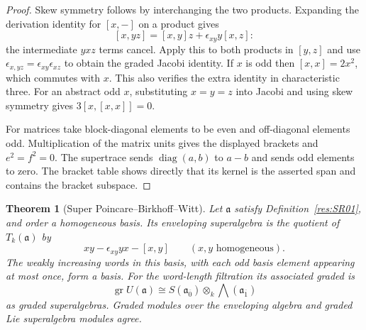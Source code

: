 \documentclass[11pt,oneside,openany]{book}
\newtheorem{theorem}{Theorem}[chapter]
\theoremstyle{definition}
\theoremstyle{remark}
\begin{document}
\begin{proof}
Skew symmetry follows by interchanging the two products.
Expanding the derivation identity for \([x,-]\) on a
product gives
\[
 [x,yz]=[x,y]z+\epsilon_{xy}y[x,z]:
\]
the intermediate \(yxz\) terms cancel. Apply this to both
products in \([y,z]\) and use
\(\epsilon_{x,yz}=\epsilon_{xy}\epsilon_{xz}\) to obtain
the graded Jacobi identity. If \(x\) is odd then
\([x,x]=2x^2\), which commutes with \(x\). This also
verifies the extra identity in characteristic three.
For an abstract odd \(x\), substituting \(x=y=z\) into
Jacobi and using skew symmetry gives \(3[x,[x,x]]=0\).

For matrices take block-diagonal elements to be even
and off-diagonal elements odd. Multiplication of the
matrix units gives the displayed brackets
and \(e^2=f^2=0\).
The supertrace sends \(\operatorname{diag}(a,b)\)
to \(a-b\) and sends odd elements to zero. The
bracket table shows directly that its kernel is
the asserted span and contains the bracket subspace.
\end{proof}

\begin{theorem}[Super Poincare--Birkhoff--Witt]
\label{res:SR03}
Let \(\mathfrak a\) satisfy Definition~\ref{res:SR01}, and
order a homogeneous basis. Its enveloping superalgebra is
the quotient of \(T_k(\mathfrak a)\) by
\[
 xy-\epsilon_{xy}yx-[x,y]\qquad(x,y\text{ homogeneous}).
\]
The weakly increasing words in this basis, with each
odd basis element appearing at most once, form a basis.
For the word-length filtration its associated graded is
\[
 \operatorname{gr} U(\mathfrak a)
   \cong S(\mathfrak a_{\overline 0})
              \otimes_k\bigwedge(\mathfrak a_{\overline 1})
\]
as graded superalgebras. Graded modules over the enveloping
algebra and graded Lie superalgebra modules agree.
\end{theorem}
\end{document}
